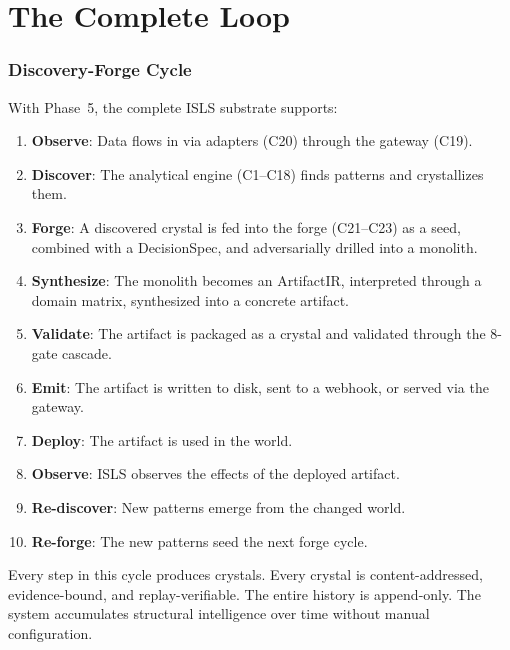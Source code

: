 \documentclass[11pt,a4paper,twoside]{article}
\theoremstyle{definition}
\theoremstyle{plain}
\theoremstyle{remark}
\newcommand{\ISLS}{\textsf{ISLS}}
\begin{document}
\part{The Complete Loop}\label{part:loop}

\section{Discovery-Forge Cycle}\label{sec:loop}

With Phase~5, the complete \ISLS{} substrate supports:

\begin{enumerate}[nosep]
  \item \textbf{Observe}: Data flows in via adapters (C20) through the
        gateway (C19).
  \item \textbf{Discover}: The analytical engine (C1--C18) finds
        patterns and crystallizes them.
  \item \textbf{Forge}: A discovered crystal is fed into the forge
        (C21--C23) as a seed, combined with a DecisionSpec, and
        adversarially drilled into a monolith.
  \item \textbf{Synthesize}: The monolith becomes an ArtifactIR,
        interpreted through a domain matrix, synthesized into a
        concrete artifact.
  \item \textbf{Validate}: The artifact is packaged as a crystal and
        validated through the 8-gate cascade.
  \item \textbf{Emit}: The artifact is written to disk, sent to a
        webhook, or served via the gateway.
  \item \textbf{Deploy}: The artifact is used in the world.
  \item \textbf{Observe}: ISLS observes the effects of the deployed
        artifact.
  \item \textbf{Re-discover}: New patterns emerge from the changed
        world.
  \item \textbf{Re-forge}: The new patterns seed the next forge cycle.
\end{enumerate}

Every step in this cycle produces crystals. Every crystal is
content-addressed, evidence-bound, and replay-verifiable. The entire
history is append-only. The system accumulates structural intelligence
over time without manual configuration.


\end{document}
